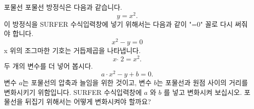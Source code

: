 \begin{surferPage}{포물선}
포물선 방정식은 다음과 같습니다.  \[y=x^2.\]
이 방정식을 SURFER 수식입력창에 넣기 위해서는 다음과 같이 "=0" 꼴로 다시 써줘야 합니다.
\[x^2-y=0\]
x 위의 조그마한 기호는 거듭제곱을 나타냅니다.  
\[ x  \,\hat{\ } \, 2 =x^2.\]
두 개의 변수를 더 넣어 봅시다.
\[a \cdot x^2-y+b=0.\]
변수 $a$는 포물선의 압축과 늘임을 위한 것이고, 변수 $b$는 포물선과 원점 사이의 거리를 변화시키기 위함입니다. 
\newline
SURFER 수식입력창에 $a$ 와 $b$ 를 넣고 변화시켜 보십시오. 포물선을 뒤집기 위해서는 어떻게 변화시켜야 할까요?
\end{surferPage}
